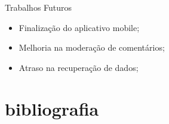 \documentclass{aula-ifb}
\begin{document}
\begin{frame}{Trabalhos Futuros}
\begin{itemize}
\item Finalização do aplicativo mobile;
\item Melhoria na moderação de comentários;
\item Atraso na recuperação de dados;
\end{itemize}
\end{frame}

\section{bibliografia}
\begin{frame}[allowframebreaks]


\end{frame}
\end{document}
